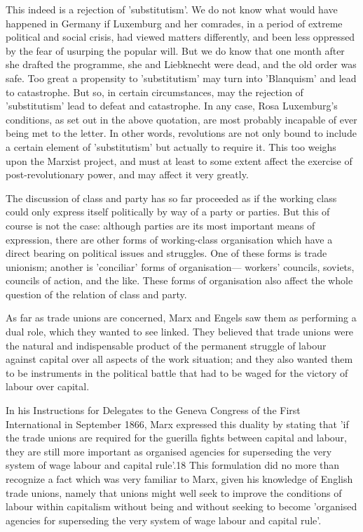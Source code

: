 This indeed is a rejection of 'substitutism'. We do not know what would have happened in Germany if Luxemburg and her comrades, in a period of extreme political and social crisis, had viewed matters differently, and been less oppressed by the fear of usurping the popular will. But we do know that one month after she drafted the programme, she and Liebknecht were dead, and the old order was safe. Too great a propensity to 'substitutism' may turn into 'Blanquism' and lead to catastrophe. But so, in certain circumstances, may the rejection of 'substitutism' lead to defeat and catastrophe. In any case, Rosa Luxemburg's conditions, as set out in the above quotation, are most probably incapable of ever being met to the letter. In other words, revolutions are not only bound to include a certain element of 'substitutism' but actually to require it. This too weighs upon the Marxist project, and must at least to some extent affect the exercise of post-revolutionary power, and may affect it very greatly.

The discussion of class and party has so far proceeded as if the working class could only express itself politically by way of a party or parties. But this of course is not the case: although parties are its most important means of expression, there are other forms of working-class organisation which have a direct bearing on political issues and struggles. One of these forms is trade unionism; another is 'conciliar' forms of organisation— workers' councils, soviets, councils of action, and the like. These forms of organisation also affect the whole question of the relation of class and party.

As far as trade unions are concerned, Marx and Engels saw them as performing a dual role, which they wanted to see linked. They believed that trade unions were the natural and indispensable product of the permanent struggle of labour against capital over all aspects of the work situation; and they also wanted them to be instruments in the political battle that had to be waged for the victory of labour over capital.

In his Instructions for Delegates to the Geneva Congress of the First International in September 1866, Marx expressed this duality by stating that 'if the trade unions are required for the guerilla fights between capital and labour, they are still more important as organised agencies for superseding the very system of wage labour and capital rule'.18 This formulation did no more than recognize a fact which was very familiar to Marx, given his knowledge of English trade unions, namely that unions might well seek to improve the conditions of labour within capitalism without being and without seeking to become 'organised agencies for superseding the very system of wage labour and capital rule'.

